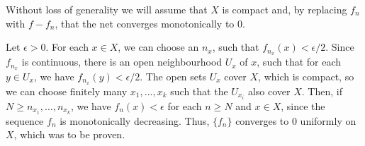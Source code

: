\documentclass[12pt]{article}
\begin{document}
Without loss of generality we will assume that $X$ is compact and, by replacing
$f_n$ with $f-f_n$, that the net converges monotonically to 0. 

Let $\epsilon > 0$.
For each $x\in X$, we can choose an $n_x$, such that $f_{n_x}(x) <
\epsilon/2$. Since $f_{n_x}$ is continuous, 
there is an open
neighbourhood $U_x$ of $x$, such that for each $y\in U_x$, we have $f_{n_x}(y)
< \epsilon/2$. The open sets $U_x$ cover $X$, which is compact, so we can choose
finitely many $x_1, \ldots, x_k$ such that the $U_{x_i}$ also cover $X$. Then,
if $N\geq n_{x_1}, \ldots, n_{x_k}$, we have $f_n(x) < \epsilon$ for each
$n\geq N$ and $x\in X$, since the sequence $f_n$ is monotonically decreasing.
Thus, $\{f_n\}$ converges to 0 uniformly on $X$, which was to be proven.
\end{document}
